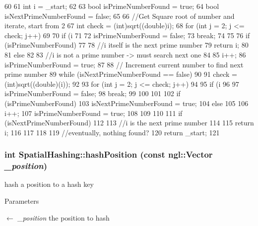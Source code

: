 \begin{DoxyCode}
60 {
61     int i = _start;
62 
63     bool isPrimeNumberFound = true;
64     bool isNextPrimeNumberFound = false;
65 
66     //Get Square root of number and iterate, start from 2
67     int check = (int)sqrt((double)i);
68     for (int j = 2; j <= check; j++)
69     {
70         if (i %
71         {
72             isPrimeNumberFound = false;
73             break;
74         }
75     }
76     if (isPrimeNumberFound)
77     {
78         //i itself is the next prime number
79         return i;
80     }
81     else
82     {
83         //i is not a prime number -> must search next one
84 
85         i++;
86         isPrimeNumberFound = true;
87 
88         // Increment current number to find next prime number
89         while (isNextPrimeNumberFound == false)
90         {
91             check = (int)sqrt((double)(i));
92 
93             for (int j = 2; j <= check; j++)
94             {
95                 if (i %
96                 {
97                     isPrimeNumberFound = false;
98                     break;
99                 }
100             }
101 
102             if (isPrimeNumberFound)
103                 isNextPrimeNumberFound = true;
104             else
105             {
106                 i++;
107                 isPrimeNumberFound = true;
108             }
109         }
110 
111         if (isNextPrimeNumberFound)
112         {
113             //i is the next prime number
114 
115             return i;
116         }
117     }
118 
119     //eventually, nothing found?
120     return _start;
121 }
\end{DoxyCode}


\hypertarget{class_spatial_hashing_a7bfce8fdfb8f8afe9a23fe1fe39875fe}{
\subsubsection[{hashPosition}]{\setlength{\rightskip}{0pt plus 5cm}int SpatialHashing::hashPosition (const ngl::Vector {\em \_\-position})}}
\label{class_spatial_hashing_a7bfce8fdfb8f8afe9a23fe1fe39875fe}


hash a position to a hash key 


\begin{DoxyParams}{Parameters}
\item[\mbox{$\leftarrow$} {\em \_\-position}]the position to hash \end{DoxyParams}


